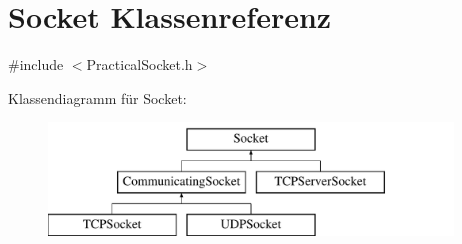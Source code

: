 \hypertarget{classSocket}{\section{Socket Klassenreferenz}
\label{classSocket}
}


{\ttfamily \#include $<$Practical\-Socket.\-h$>$}

Klassendiagramm für Socket\-:\begin{figure}[H]
\begin{center}
\leavevmode
\includegraphics[height=3.000000cm]{classSocket}
\end{center}
\end{figure}
